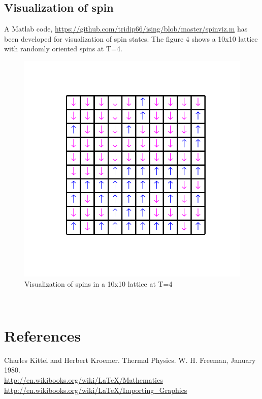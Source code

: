 \documentclass[]{article}
\begin{document}
\subsection{Visualization of spin}
A Matlab code, \url{https://github.com/tridip66/ising/blob/master/spinviz.m} has been developed for visualization of spin states. The figure 4 shows a 10x10 lattice with randomly oriented spins at T=4.
\begin{figure}[H]
  \centering
  \includegraphics[scale=0.5]{figures/fig_6}%
  \caption{\label{fig:epsart} Visualization of spins in a 10x10 lattice at T=4}
\end{figure}
\\
\section*{References}
Charles Kittel and Herbert Kroemer. Thermal Physics. W. H. Freeman, January 1980. 
\\
\url{http://en.wikibooks.org/wiki/LaTeX/Mathematics}
\\
\url{http://en.wikibooks.org/wiki/LaTeX/Importing_Graphics}
\\
\appendix
\end{document}
